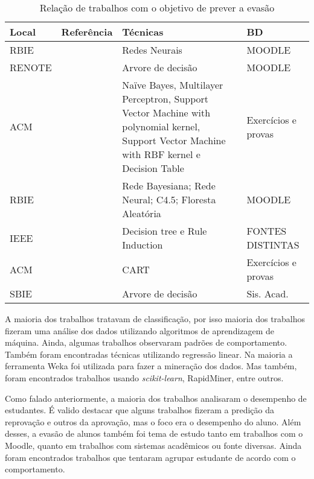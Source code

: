 \documentclass[ti]{texufpel} %
\begin{document}
\begin{table}
\begin{center}
\caption{Relação de trabalhos com o objetivo de prever a evasão}\label{relacao-trabalhos-evasao}
\begin{tabular}{p{1.4cm}|p{7cm}|p{4cm}|p{1.5cm}}
\hline
Local & Referência & Técnicas & BD \\
\hline
{\small RBIE} & {\small\em \citet{rigo2014aplicaccoes}} & {\small Redes Neurais} & {\small MOODLE} \\
{\small RENOTE} & {\small\em \citet{da2014minerando}} & {\small Arvore de decisão} & {\small MOODLE} \\
{\small ACM} & {\small\em \citet{manhaes2014wave}} & {\small Naïve Bayes, Multilayer Perceptron, Support Vector Machine with polynomial kernel, Support Vector Machine with RBF kernel e Decision Table} & {\small Exercícios e provas} \\
{\small RBIE} & {\small\em \citet{detoni2015modelagem}} & {\small Rede Bayesiana; Rede Neural; C4.5; Floresta Aleatória} & {\small MOODLE} \\
{\small IEEE} & {\small\em \citet{pradeep2015students}} & {\small Decision tree e Rule Induction} & {\small FONTES DISTINTAS} \\
{\small ACM} & {\small\em \citet{hasbun2016extracurricular}} & {\small CART} & {\small Exercícios e provas} \\
{\small SBIE} & {\small\em \citet{lanes2018prediccao}} & {\small Arvore de decisão} & {\small Sis. Acad.} \\
\hline
\end{tabular}
\end{center}
\end{table}

A maioria dos trabalhos tratavam de classificação, por isso maioria dos trabalhos fizeram uma análise dos dados utilizando algoritmos de aprendizagem de máquina. Ainda, algumas trabalhos observaram padrões de comportamento. Também foram encontradas técnicas utilizando regressão linear. Na maioria a ferramenta Weka foi utilizada para fazer a mineração dos dados. Mas também, foram encontrados trabalhos usando \textit{scikit-learn}, RapidMiner, entre outros.

Como falado anteriormente, a maioria dos trabalhos analisaram o desempenho de estudantes. É valido destacar que alguns trabalhos fizeram a predição da reprovação e outros da aprovação, mas o foco era o desempenho do aluno. Além desses, a evasão de alunos também foi tema de estudo tanto em trabalhos com o Moodle, quanto em trabalhos com sistemas acadêmicos ou fonte diversas. Ainda foram encontrados trabalhos que tentaram agrupar estudante de acordo com o comportamento.
\end{document}
